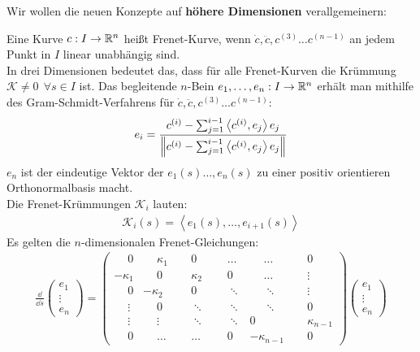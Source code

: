 Wir wollen die neuen Konzepte auf \textbf{höhere Dimensionen} verallgemeinern:\\
\begin{defs}
	Eine Kurve $c: I \rightarrow \mathbb{R}^n$ heißt Frenet-Kurve, wenn $\dot{c}, \ddot{c}, c^{(3)} \dots c^{(n-1)}$ an jedem Punkt in $I$ linear unabhängig sind. \\
	In drei Dimensionen bedeutet das, dass für alle Frenet-Kurven die Krümmung $\mathcal{K} \neq 0 \ \ \forall s \in I$ ist. Das begleitende $n$-Bein $e_1,\dots,e_n: I \rightarrow \mathbb{R}^n$ erhält man mithilfe des Gram-Schmidt-Verfahrens für $\dot{c}, \ddot{c}, c^{(3)} \dots c^{(n-1)}$: 
	\begin{align}
		e_i = \frac{c^{(i)}-\sum_{j=1}^{i-1}\left<c^{(i)},e_j\right>e_j}{\norm{c^{(i)}-\sum_{j=1}^{i-1}\left<c^{(i)},e_j\right>e_j}}
	\end{align} 
$e_n$ ist der eindeutige Vektor der $e_1(s)\dots,e_n(s)$ zu einer positiv orientieren Orthonormalbasis macht. \\
Die Frenet-Krümmungen $\mathcal{K}_i$ lauten:
\begin{align}
	\mathcal{K}_i(s) = \left<e_1(s),\dots,e_{i+1}(s)\right>
\end{align}
Es gelten die $n$-dimensionalen Frenet-Gleichungen:
\begin{align}
	\frac{\dd}{\dd s}\begin{pmatrix} e_1 \\ \vdots \\ e_n\end{pmatrix} = 
	\begin{pmatrix} 
\phantom{-}0 & \phantom{-}\kappa_1 & \phantom{-}0 & \phantom{-}\ldots & \phantom{-}\ldots & \phantom{-}0 \\ 
-\kappa_1 & \phantom{-}0 & \phantom{-}\kappa_2 & \phantom{-}0 & \phantom{-}\ldots & \phantom{-}\vdots \\ 
\phantom{-}0 & -\kappa_2 & \phantom{-}0  & \phantom{-}\ddots & \phantom{-}\ddots & \phantom{-}\vdots \\
\phantom{-}\vdots & \phantom{-}0 & \phantom{-}\ddots  & \phantom{-}\ddots & \phantom{-}\ddots & \phantom{-}0 \\
\phantom{-}\vdots & \phantom{-}\vdots & \phantom{-}\ddots  & \phantom{-}\ddots & 0 & \phantom{-}\kappa_{n-1} \\
\phantom{-}0 & \phantom{-}\ldots & \phantom{-}\ldots  & \phantom{-}0  & -\kappa_{n-1} & \phantom{-}0
\end{pmatrix}
	\begin{pmatrix} e_1 \\ \vdots \\ e_n\end{pmatrix}

\end{align}
\end{defs}
